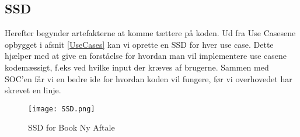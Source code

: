 \subsection{SSD}
\label{SSD}

Herefter begynder artefakterne at komme tættere på koden. Ud fra Use Casesene opbygget i afsnit \ref{UseCases} kan vi oprette en SSD for hver use case. Dette hjælper med at give en forståelse for hvordan man vil implementere use casene kodemæssigt, f.eks ved hvilke input der kræves af brugerne. Sammen med SOC'en får vi en bedre ide for hvordan koden vil fungere, før vi overhovedet har skrevet en linje.

\begin{figure}[H]
    \caption{SSD for Book Ny Aftale}
    \centering
        \texttt{[image: SSD.png]}
    \label{forretning:ssd}
\end{figure}